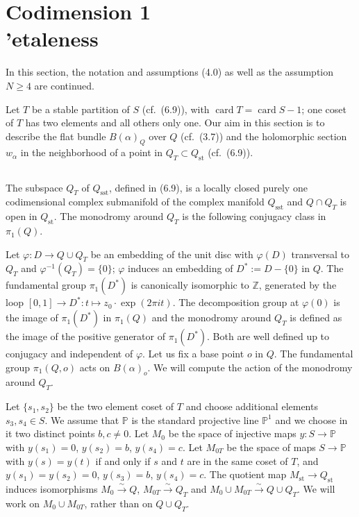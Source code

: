 \documentclass[12pt,a4paper]{article}
\theoremstyle{plain}
\theoremstyle{definition}
\theoremstyle{remark}
\DeclareMathOperator{\card}{card}
\newcommand{\PP}{\mathbb{P}}
\newcommand{\ZZ}{\mathbb{Z}}
\numberwithin{equation}{section}
\providecommand{\PP}{\mathbb{P}}
\providecommand{\ZZ}{\mathbb{Z}}
\begin{document}
\section{Codimension 1 \\'etaleness}

In this section, the notation and assumptions (4.0) as well as the assumption $N \geq 4$ are continued.

Let $T$ be a stable partition of $S$ (cf.\ (6.9)), with $\card T = \card S - 1$; one coset of $T$ has two elements and all others only one. Our aim in this section is to describe the flat bundle $B(\alpha)_Q$ over $Q$ (cf.\ (3.7)) and the holomorphic section $w_\alpha$ in the neighborhood of a point in $Q_T \subset Q_{\mathrm{st}}$ (cf.\ (6.9)).

\subsection{}
The subspace $Q_T$ of $Q_{\mathrm{sst}}$, defined in (6.9), is a locally closed purely one codimensional complex submanifold of the complex manifold $Q_{\mathrm{sst}}$ and $Q \cap Q_T$ is open in $Q_{\mathrm{st}}$. The monodromy around $Q_T$ is the following conjugacy class in $\pi_1(Q)$.

Let $\varphi: D \to Q \cup Q_T$ be an embedding of the unit disc with $\varphi(D)$ transversal to $Q_T$ and $\varphi^{-1}(Q_T) = \{0\}$; $\varphi$ induces an embedding of $D^* := D - \{0\}$ in $Q$. The fundamental group $\pi_1(D^*)$ is canonically isomorphic to $\ZZ$, generated by the loop $[0, 1] \to D^*: t \mapsto z_0 \cdot \exp(2\pi i t)$. The decomposition group at $\varphi(0)$ is the image of $\pi_1(D^*)$ in $\pi_1(Q)$ and the monodromy around $Q_T$ is defined as the image of the positive generator of $\pi_1(D^*)$. Both are well defined up to conjugacy and independent of $\varphi$. Let us fix a base point $o$ in $Q$. The fundamental group $\pi_1(Q, o)$ acts on $B(\alpha)_o$. We will compute the action of the monodromy around $Q_T$.

Let $\{s_1, s_2\}$ be the two element coset of $T$ and choose additional elements $s_3, s_4 \in S$. We assume that $\PP$ is the standard projective line $\PP^1$ and we choose in it two distinct points $b, c \neq 0$. Let $M_0$ be the space of injective maps $y: S \to \PP$ with $y(s_1) = 0$, $y(s_2) = b$, $y(s_4) = c$. Let $M_{0T}$ be the space of maps $S \to \PP$ with $y(s) = y(t)$ if and only if $s$ and $t$ are in the same coset of $T$, and $y(s_1) = y(s_2) = 0$, $y(s_3) = b$, $y(s_4) = c$. The quotient map $M_{\mathrm{st}} \to Q_{\mathrm{st}}$ induces isomorphisms $M_0 \xrightarrow{\sim} Q$, $M_{0T} \xrightarrow{\sim} Q_T$ and $M_0 \cup M_{0T} \xrightarrow{\sim} Q \cup Q_T$. We will work on $M_0 \cup M_{0T}$, rather than on $Q \cup Q_T$.
\end{document}
